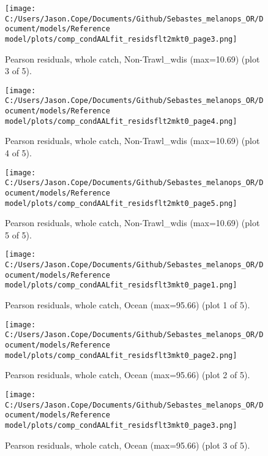 \documentclass[11pt,
  english,
  letterpaper,
]{article}
\begin{document}
\begin{figure}
\centering
\texttt{[image: C:/Users/Jason.Cope/Documents/Github/Sebastes\_melanops\_OR/Document/models/Reference model/plots/comp\_condAALfit\_residsflt2mkt0\_page3.png]}
\caption{Pearson residuals, whole catch, Non-Trawl\_wdis (max=10.69) (plot 3 of 5).\label{fig:comp_condAALfit_residsflt2mkt0_page3}}
\end{figure}

\begin{figure}
\centering
\texttt{[image: C:/Users/Jason.Cope/Documents/Github/Sebastes\_melanops\_OR/Document/models/Reference model/plots/comp\_condAALfit\_residsflt2mkt0\_page4.png]}
\caption{Pearson residuals, whole catch, Non-Trawl\_wdis (max=10.69) (plot 4 of 5).\label{fig:comp_condAALfit_residsflt2mkt0_page4}}
\end{figure}

\begin{figure}
\centering
\texttt{[image: C:/Users/Jason.Cope/Documents/Github/Sebastes\_melanops\_OR/Document/models/Reference model/plots/comp\_condAALfit\_residsflt2mkt0\_page5.png]}
\caption{Pearson residuals, whole catch, Non-Trawl\_wdis (max=10.69) (plot 5 of 5).\label{fig:comp_condAALfit_residsflt2mkt0_page5}}
\end{figure}

\begin{figure}
\centering
\texttt{[image: C:/Users/Jason.Cope/Documents/Github/Sebastes\_melanops\_OR/Document/models/Reference model/plots/comp\_condAALfit\_residsflt3mkt0\_page1.png]}
\caption{Pearson residuals, whole catch, Ocean (max=95.66) (plot 1 of 5).\label{fig:comp_condAALfit_residsflt3mkt0_page1}}
\end{figure}

\begin{figure}
\centering
\texttt{[image: C:/Users/Jason.Cope/Documents/Github/Sebastes\_melanops\_OR/Document/models/Reference model/plots/comp\_condAALfit\_residsflt3mkt0\_page2.png]}
\caption{Pearson residuals, whole catch, Ocean (max=95.66) (plot 2 of 5).\label{fig:comp_condAALfit_residsflt3mkt0_page2}}
\end{figure}

\begin{figure}
\centering
\texttt{[image: C:/Users/Jason.Cope/Documents/Github/Sebastes\_melanops\_OR/Document/models/Reference model/plots/comp\_condAALfit\_residsflt3mkt0\_page3.png]}
\caption{Pearson residuals, whole catch, Ocean (max=95.66) (plot 3 of 5).\label{fig:comp_condAALfit_residsflt3mkt0_page3}}
\end{figure}
\end{document}
